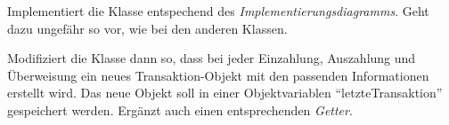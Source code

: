\documentclass[10pt, a4paper]{scrartcl}
\begin{document}
\begin{aufgabe}[symbol=\symPartner\,\symLaptop]
	Implementiert die Klasse  entspechend des \emph{Implementierungsdiagramms}. Geht dazu ungefähr so vor, wie bei den anderen Klassen.
	
	Modifiziert die Klasse  dann so, dass bei jeder Einzahlung, Auszahlung und Überweisung ein neues Transaktion-Objekt mit den passenden Informationen erstellt wird. Das neue Objekt soll in einer Objektvariablen \enquote{letzteTransaktion} gespeichert werden. Ergänzt auch einen entsprechenden \emph{Getter}.
\end{aufgabe}

\clearpage
\end{document}
